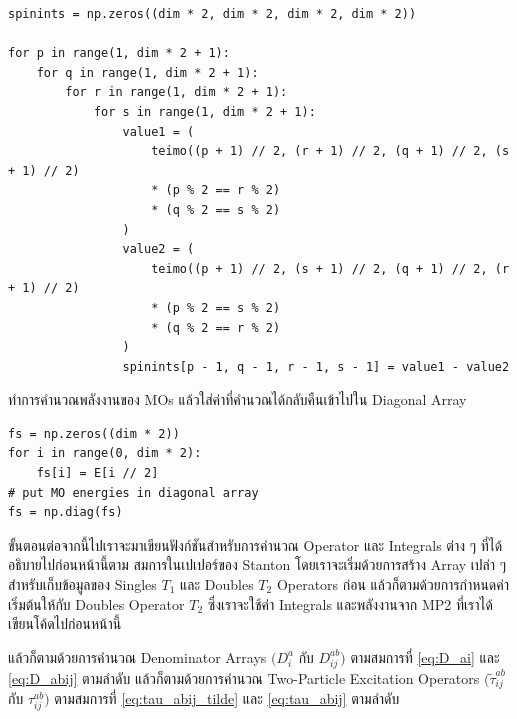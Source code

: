 \begin{lstlisting}[style=MyPython]
spinints = np.zeros((dim * 2, dim * 2, dim * 2, dim * 2))

for p in range(1, dim * 2 + 1):
    for q in range(1, dim * 2 + 1):
        for r in range(1, dim * 2 + 1):
            for s in range(1, dim * 2 + 1):
                value1 = (
                    teimo((p + 1) // 2, (r + 1) // 2, (q + 1) // 2, (s + 1) // 2)
                    * (p % 2 == r % 2)
                    * (q % 2 == s % 2)
                )
                value2 = (
                    teimo((p + 1) // 2, (s + 1) // 2, (q + 1) // 2, (r + 1) // 2)
                    * (p % 2 == s % 2)
                    * (q % 2 == r % 2)
                )
                spinints[p - 1, q - 1, r - 1, s - 1] = value1 - value2
\end{lstlisting}

\vspace{5pt}

\noindent ทำการคำนวณพลังงานของ MOs แล้วใส่ค่าที่คำนวณได้กลับคืนเข้าไปใน Diagonal Array

\vspace{5pt}

\begin{lstlisting}[style=MyPython]
fs = np.zeros((dim * 2))
for i in range(0, dim * 2):
    fs[i] = E[i // 2]
# put MO energies in diagonal array
fs = np.diag(fs)
\end{lstlisting}

\vspace{5pt}

\noindent ขั้นตอนต่อจากนี้ไปเราจะมาเขียนฟังก์ชันสำหรับการคำนวณ Operator และ Integrals ต่าง ๆ ที่ได้อธิบายไปก่อนหน้านี้ตาม%
สมการในเปเปอร์ของ Stanton โดยเราจะเริ่มด้วยการสร้าง Array เปล่า ๆ สำหรับเก็บข้อมูลของ Singles $T_{1}$ และ Doubles $T_{2}$
Operators ก่อน แล้วก็ตามด้วยการกำหนดค่าเริ่มต้นให้กับ Doubles Operator $T_{2}$ ซึ่งเราจะใช้ค่า Integrals และพลังงานจาก MP2
ที่เราได้เขียนโค้ดไปก่อนหน้านี้

\noindent แล้วก็ตามด้วยการคำนวณ Denominator Arrays $(D^{a}_{i}$ กับ $D^{ab}_{ij})$ ตามสมการที่ \eqref{eq:D_ai}
และ \eqref{eq:D_abij} ตามลำดับ แล้วก็ตามด้วยการคำนวณ Two-Particle Excitation Operators $(\tilde{\tau}_{i j}^{a b}$
กับ $\tau_{i j}^{a b})$ ตามสมการที่ \eqref{eq:tau_abij_tilde} และ \eqref{eq:tau_abij} ตามลำดับ

\vspace{5pt}

